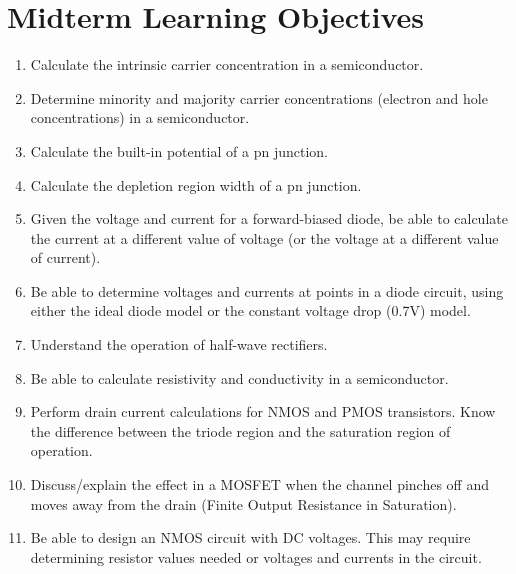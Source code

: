 \documentclass[10pt, letterpaper]{article}
\begin{document}
\section*{Midterm Learning Objectives}
\begin{enumerate}
    \item Calculate the intrinsic carrier concentration in a semiconductor.
    \item Determine minority and majority carrier concentrations (electron and hole concentrations) in a semiconductor.
    \item Calculate the built-in potential of a pn junction.
    \item Calculate the depletion region width of a pn junction.
    \item Given the voltage and current for a forward-biased diode, be able to calculate the current at a different value of voltage (or the voltage at a different value of current).
    \item Be able to determine voltages and currents at points in a diode circuit, using either the ideal diode model or the constant voltage drop (0.7V) model.
    \item Understand the operation of half-wave rectifiers.
    \item Be able to calculate resistivity and conductivity in a semiconductor.
    \item Perform drain current calculations for NMOS and PMOS transistors. Know the difference between the triode region and the saturation region of operation.
    \item Discuss/explain the effect in a MOSFET when the channel pinches off and moves away from the drain (Finite Output Resistance in Saturation).
    \item Be able to design an NMOS circuit with DC voltages. This may require determining resistor values needed or voltages and currents in the circuit.
\end{enumerate}
\end{document}
